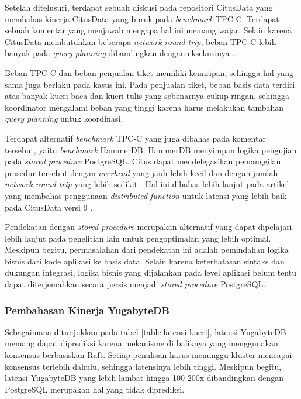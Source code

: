 Setelah ditelusuri, terdapat sebuah diskusi pada repositori CitusData yang membahas kinerja CitusData yang buruk pada \textit{benchmark} TPC-C. Terdapat sebuah komentar yang menjawab mengapa hal ini memang wajar. Selain karena CitusData membutuhkan beberapa \textit{network round-trip}, beban TPC-C lebih banyak pada \textit{query planning} dibandingkan dengan eksekusinya \parencite{Slot2020}.

Beban TPC-C dan beban penjualan tiket memiliki kemiripan, sehingga hal yang sama juga berlaku pada kasus ini. Pada penjualan tiket, beban basis data terdiri atas banyak kueri baca dan kueri tulis yang sebenarnya cukup ringan, sehingga koordinator mengalami beban yang tinggi karena harus melakukan tambahan \textit{query planning} untuk koordinasi.

Terdapat alternatif \textit{benchmark} TPC-C yang juga dibahas pada komentar tersebut, yaitu \textit{benchmark} HammerDB. HammerDB menyimpan logika pengujian pada \textit{stored procedure} PostgreSQL. Citus dapat mendelegasikan pemanggilan prosedur tersebut dengan \textit{overhead} yang jauh lebih kecil dan dengan jumlah \textit{network round-trip} yang lebih sedikit \parencite{Slot2020}. Hal ini dibahas lebih lanjut pada artikel yang membahas penggunaan \textit{distributed function} untuk latensi yang lebih baik pada CitusData versi 9 \parencite{Slot2020faster}.

Pendekatan dengan \textit{stored procedure} merupakan alternatif yang dapat dipelajari lebih lanjut pada penelitian lain untuk pengoptimalan yang lebih optimal. Meskipun begitu, permasalahan dari pendekatan ini adalah pemindahan logika bisnis dari kode aplikasi ke basis data. Selain karena keterbatasan sintaks dan dukungan integrasi, logika bisnis yang dijalankan pada level aplikasi belum tentu dapat diterjemahkan secara persis menjadi \textit{stored procedure} PostgreSQL.

\subsubsection{Pembahasan Kinerja YugabyteDB}

Sebagaimana ditunjukkan pada tabel \ref{table:latensi-kueri}, latensi YugabyteDB memang dapat diprediksi karena mekanisme di baliknya yang menggunakan konsensus berbasiskan Raft. Setiap penulisan harus menunggu kluster mencapai konsensus terlebih dahulu, sehingga latensinya lebih tinggi. Meskipun begitu, latensi YugabyteDB yang lebih lambat hingga 100-200x dibandingkan dengan PostgreSQL merupakan hal yang tidak diprediksi.

